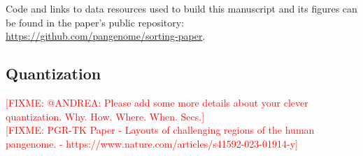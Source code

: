\documentclass{bioinfo}
\theoremstyle{definition}
\newcommand{\red}[1]{{\textcolor{Red}{#1}}}
\newcommand{\FIXME}[1]{\red{[FIXME: #1]}}
\begin{document}
	Code and links to data resources used to build this manuscript and its figures can be found in the paper's public repository: \url{https://github.com/pangenome/sorting-paper}.
	
	
	
	
	
	\begin{appendices}
	    \section{Quantization}
	    \FIXME{@ANDREA: Please add some more details about your clever quantization. Why. How. Where. When. Secs.} \\
	    \FIXME{PGR-TK Paper - Layouts of challenging regions of the human pangenome. - https://www.nature.com/articles/s41592-023-01914-y}
	\end{appendices}
\end{document}
